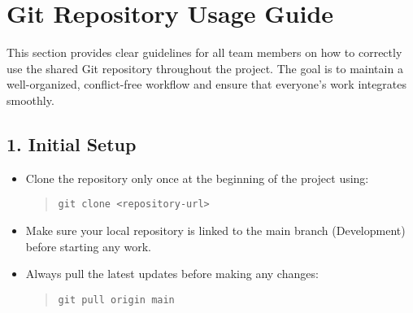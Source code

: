 \documentclass[a4paper,12pt]{article}
\begin{document}
\newpage
\section*{Git Repository Usage Guide}

\noindent
This section provides clear guidelines for all team members on how to correctly use the shared Git repository throughout the project.  
The goal is to maintain a well-organized, conflict-free workflow and ensure that everyone’s work integrates smoothly.

\vspace{0.5cm}
\subsection*{1. Initial Setup}
\begin{itemize}[leftmargin=1.2cm]
    \item Clone the repository only once at the beginning of the project using:
    \begin{quote}
        \texttt{git clone <repository-url>}
    \end{quote}
    \item Make sure your local repository is linked to the main branch ({\large Development}) before starting any work.
    \item Always pull the latest updates before making any changes:
    \begin{quote}
        \texttt{git pull origin main}
    \end{quote}
\end{itemize}

\vspace{0.3cm}
\end{document}
